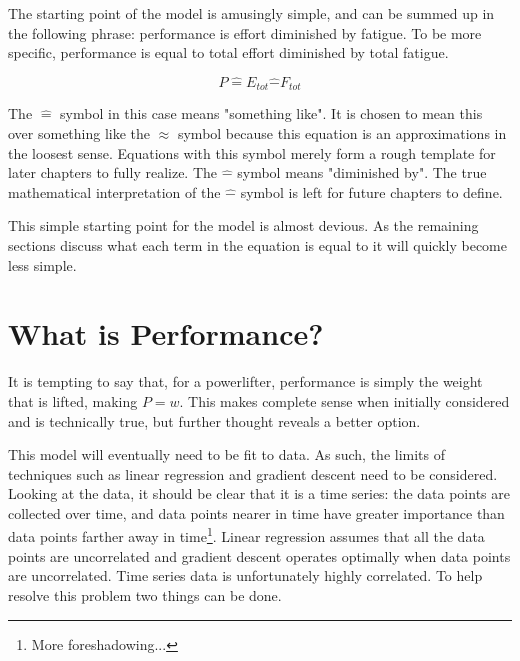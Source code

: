 The starting point of the model is amusingly simple, and can be summed up in the following phrase: performance is effort diminished by fatigue. To be more specific, performance is equal to total effort diminished by total fatigue. 

\begin{equation}
	\label{eq:P2C1_EffortFatigue}
	P \hat{=} E_{tot}\hat{-}F_{tot}
\end{equation}

The $\hat{=}$ symbol in this case means "something like". It is chosen to mean this over something like the $\approx$ symbol because this equation is an approximations in the loosest sense. Equations with this symbol merely form a rough template for later chapters to fully realize. The $\hat{-}$ symbol means "diminished by". The true mathematical interpretation of the $\hat{-}$ symbol is left for future chapters to define.

This simple starting point for the model is almost devious. As the remaining sections discuss what each term in the equation is equal to it will quickly become less simple.

\section{What is Performance?}
\label{sec:P2C1_WhatIsPerformance}


It is tempting to say that, for a powerlifter, performance is simply the weight that is lifted, making $P=w$. This makes complete sense when initially considered and is technically true, but further thought reveals a better option.

This model will eventually need to be fit to data. As such, the limits of techniques such as linear regression and gradient descent need to be considered. Looking at the data, it should be clear that it is a time series: the data points are collected over time, and data points nearer in time have greater importance than data points farther away in time\footnote{More foreshadowing...}. Linear regression assumes that all the data points are uncorrelated and gradient descent operates optimally when data points are uncorrelated. Time series data is unfortunately highly correlated. To help resolve this problem two things can be done.

